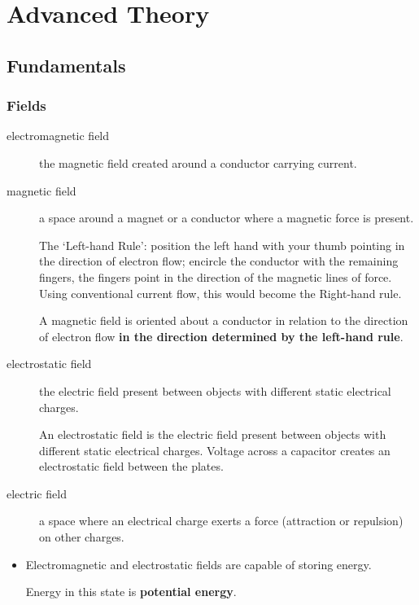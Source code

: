 \documentclass[letterpaper]{article}
\begin{document}
    \newpage

    
    \section{Advanced Theory}
        \subsection{Fundamentals}
        \subsubsection{Fields}
        \begin{description}
            \item[electromagnetic field] the magnetic field created around a conductor carrying current.
            \item[magnetic field] a space around a magnet or a conductor where a magnetic force is present.

                The `Left-hand Rule':
                position the left hand with your thumb pointing in the direction of electron flow;
                encircle the conductor with the remaining fingers, the fingers point in the direction of the magnetic lines of force.
                Using conventional current flow, this would become the Right-hand rule.

                A magnetic field is oriented about a conductor in relation to the direction of electron flow \textbf{in the direction determined by the left-hand rule}.

            \item[electrostatic field] the electric field present between objects with different static electrical charges.

                An electrostatic field is the electric field present between objects with different static electrical charges.
                Voltage across a capacitor creates an electrostatic field between the plates.

            \item[electric field] a space where an electrical charge exerts a force (attraction or repulsion) on other charges.
        \end{description}

        \begin{itemize}
            \item Electromagnetic and electrostatic fields are capable of storing energy.

                Energy in this state is \textbf{potential energy}.
        \end{itemize}
\end{document}
